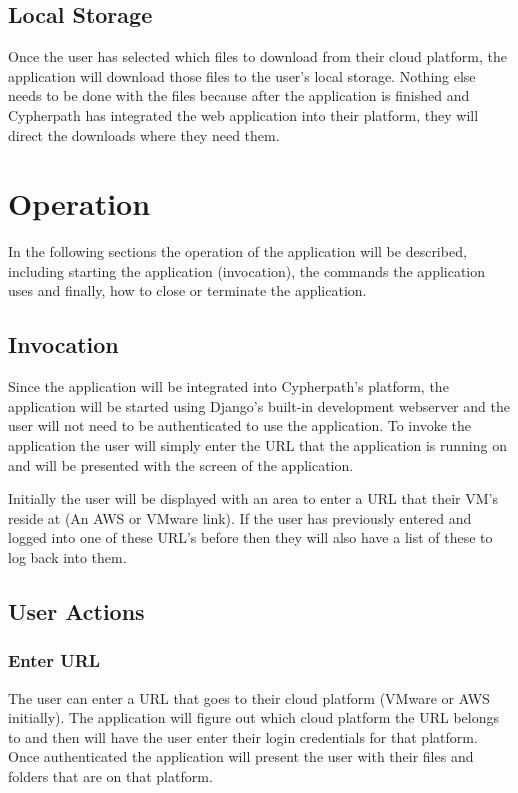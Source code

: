 \documentclass{article}
\begin{document}
        \subsection{Local Storage}
        Once the user has selected which files to download from their cloud platform, the application will download those
        files to the user's local storage. Nothing else needs to be done with the files because after the application is finished
        and Cypherpath has integrated the web application into their platform, they will direct the downloads where they need them.


    \section{Operation}
    In the following sections the operation of the application will be described, including starting the application
    (invocation), the commands the application uses and finally, how to close or terminate the application.

        \subsection{Invocation}
        Since the application will be integrated into Cypherpath's platform, the application will be started using Django's built-in development webserver and
        the user will not need to be authenticated to use the application. To invoke the application the user will simply enter the URL that the application is running on and will
        be presented with the screen of the application.

        Initially the user will be displayed with an area to enter a URL that their VM's reside at (An AWS or VMware link). If the user has previously entered and logged into one of these
        URL's before then they will also have a list of these to log back into them.

        \subsection{User Actions}
            \subsubsection{Enter URL}
            The user can enter a URL that goes to their cloud platform (VMware or AWS initially). The application will figure out which cloud platform the URL belongs to and then will have the
            user enter their login credentials for that platform. Once authenticated the application will present the user with their files and folders that are on that platform.
            
\end{document}
